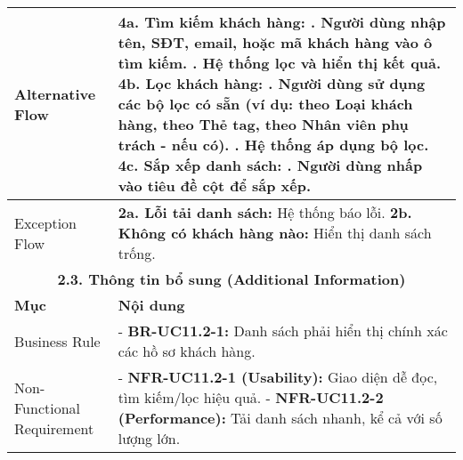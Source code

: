 \begin{longtable}{|m{4cm}|p{11cm}|}
\hline
Alternative Flow & \textbf{4a. Tìm kiếm khách hàng:} \newline    1. Người dùng nhập tên, SĐT, email, hoặc mã khách hàng vào ô tìm kiếm. \newline    2. Hệ thống lọc và hiển thị kết quả. \newline \textbf{4b. Lọc khách hàng:} \newline    1. Người dùng sử dụng các bộ lọc có sẵn (ví dụ: theo Loại khách hàng, theo Thẻ tag, theo Nhân viên phụ trách - nếu có). \newline    2. Hệ thống áp dụng bộ lọc. \newline \textbf{4c. Sắp xếp danh sách:} \newline    1. Người dùng nhấp vào tiêu đề cột để sắp xếp. \\
\hline
Exception Flow & \textbf{2a. Lỗi tải danh sách:} Hệ thống báo lỗi. \newline \textbf{2b. Không có khách hàng nào:} Hiển thị danh sách trống. \\
\hline
\multicolumn{2}{|c|}{\textbf{2.3. Thông tin bổ sung (Additional Information)}} \\
\hline
\textbf{Mục} & \textbf{Nội dung} \\
\hline
Business Rule & - \textbf{BR-UC11.2-1:} Danh sách phải hiển thị chính xác các hồ sơ khách hàng. \\
\hline
Non-Functional Requirement & - \textbf{NFR-UC11.2-1 (Usability):} Giao diện dễ đọc, tìm kiếm/lọc hiệu quả. \newline - \textbf{NFR-UC11.2-2 (Performance):} Tải danh sách nhanh, kể cả với số lượng lớn. \\
\hline
\end{longtable}

